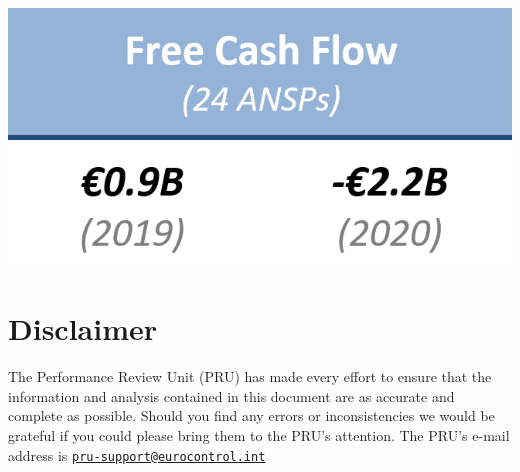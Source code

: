 \documentclass[
]{book}
\begin{document}
\begin{center}\includegraphics[width=1\linewidth]{figures/Figure-5-7} \end{center}

\hypertarget{disclaimer}{%
\chapter*{Disclaimer}\label{disclaimer}}

\begin{infobox}
The Performance Review Unit (PRU) has made every effort to ensure that
the information and analysis contained in this document are as accurate
and complete as possible. Should you find any errors or inconsistencies
we would be grateful if you could please bring them to the PRU's
attention. The PRU's e-mail address is
\href{mailto:pru-support@eurocontrol.int}{\nolinkurl{pru-support@eurocontrol.int}}

\end{infobox}

\backmatter
\end{document}
